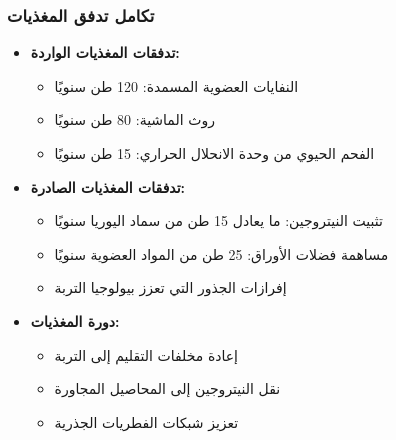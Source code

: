 \subsubsection{تكامل تدفق المغذيات}
\begin{itemize}
    \item \textbf{تدفقات المغذيات الواردة:}
    \begin{itemize}
        \item النفايات العضوية المسمدة: 120 طن سنويًا
        \item روث الماشية: 80 طن سنويًا
        \item الفحم الحيوي من وحدة الانحلال الحراري: 15 طن سنويًا
    \end{itemize}
    \item \textbf{تدفقات المغذيات الصادرة:}
    \begin{itemize}
        \item تثبيت النيتروجين: ما يعادل 15 طن من سماد اليوريا سنويًا
        \item مساهمة فضلات الأوراق: 25 طن من المواد العضوية سنويًا
        \item إفرازات الجذور التي تعزز بيولوجيا التربة
    \end{itemize}
    \item \textbf{دورة المغذيات:}
    \begin{itemize}
        \item إعادة مخلفات التقليم إلى التربة
        \item نقل النيتروجين إلى المحاصيل المجاورة
        \item تعزيز شبكات الفطريات الجذرية
    \end{itemize}
\end{itemize}

